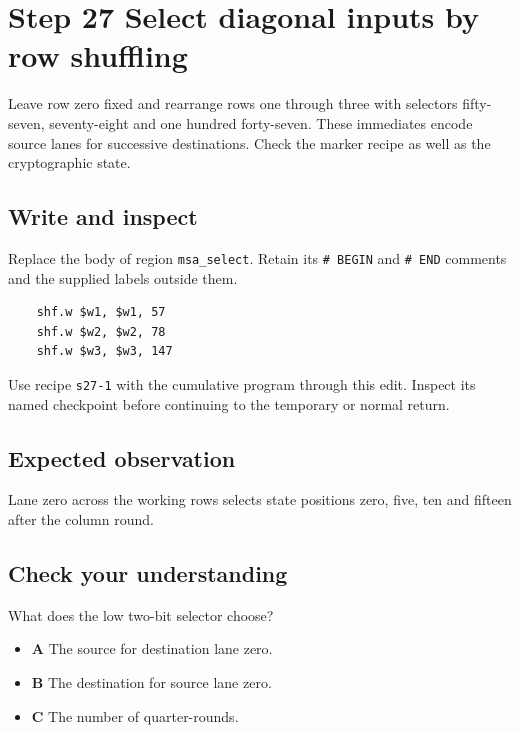 \section{Step 27 Select diagonal inputs by row shuffling}\label{chacha-s27}

Leave row zero fixed and rearrange rows one through three with selectors fifty-seven, seventy-eight and one hundred forty-seven. These immediates encode source lanes for successive destinations. Check the marker recipe as well as the cryptographic state.

\subsection{Write and inspect}
Replace the body of region \texttt{msa\_select}. Retain its \texttt{\# BEGIN} and \texttt{\# END} comments and the supplied labels outside them.

\begin{verbatim}
    shf.w $w1, $w1, 57
    shf.w $w2, $w2, 78
    shf.w $w3, $w3, 147
\end{verbatim}

Use recipe \texttt{s27-1} with the cumulative program through this edit. Inspect its named checkpoint before continuing to the temporary or normal return.

\subsection{Expected observation}
Lane zero across the working rows selects state positions zero, five, ten and fifteen after the column round.

\subsection{Check your understanding}
What does the low two-bit selector choose?

\begin{itemize}
  \item \textbf{A} The source for destination lane zero.
  \item \textbf{B} The destination for source lane zero.
  \item \textbf{C} The number of quarter-rounds.
\end{itemize}
